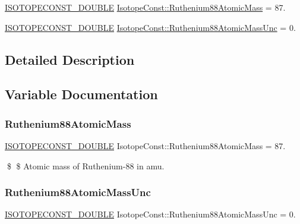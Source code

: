 \begin{DoxyCompactItemize}
\item 
\mbox{\hyperlink{group___isotope_const-_macros_ga8f45a7272ce02c0b4c65c44636ed719a}{I\+S\+O\+T\+O\+P\+E\+C\+O\+N\+S\+T\+\_\+\+D\+O\+U\+B\+LE}} \mbox{\hyperlink{group___isotope_const-_ruthenium-_ru88_gaf46d3076706c601da17e4699d521dd4a}{Isotope\+Const\+::\+Ruthenium88\+Atomic\+Mass}} = 87.
\item 
\mbox{\hyperlink{group___isotope_const-_macros_ga8f45a7272ce02c0b4c65c44636ed719a}{I\+S\+O\+T\+O\+P\+E\+C\+O\+N\+S\+T\+\_\+\+D\+O\+U\+B\+LE}} \mbox{\hyperlink{group___isotope_const-_ruthenium-_ru88_gaafae669f96923e9ad14863146ba9f624}{Isotope\+Const\+::\+Ruthenium88\+Atomic\+Mass\+Unc}} = 0.
\end{DoxyCompactItemize}


\subsection{Detailed Description}


\subsection{Variable Documentation}
\mbox{\label{group___isotope_const-_ruthenium-_ru88_gaf46d3076706c601da17e4699d521dd4a}} 
\subsubsection{\texorpdfstring{Ruthenium88\+Atomic\+Mass}{Ruthenium88AtomicMass}}
{\footnotesize\ttfamily \mbox{\hyperlink{group___isotope_const-_macros_ga8f45a7272ce02c0b4c65c44636ed719a}{I\+S\+O\+T\+O\+P\+E\+C\+O\+N\+S\+T\+\_\+\+D\+O\+U\+B\+LE}} Isotope\+Const\+::\+Ruthenium88\+Atomic\+Mass = 87.}

\$ \$ Atomic mass of Ruthenium-\/88 in amu. \mbox{\label{group___isotope_const-_ruthenium-_ru88_gaafae669f96923e9ad14863146ba9f624}} 
\subsubsection{\texorpdfstring{Ruthenium88\+Atomic\+Mass\+Unc}{Ruthenium88AtomicMassUnc}}
{\footnotesize\ttfamily \mbox{\hyperlink{group___isotope_const-_macros_ga8f45a7272ce02c0b4c65c44636ed719a}{I\+S\+O\+T\+O\+P\+E\+C\+O\+N\+S\+T\+\_\+\+D\+O\+U\+B\+LE}} Isotope\+Const\+::\+Ruthenium88\+Atomic\+Mass\+Unc = 0.}

